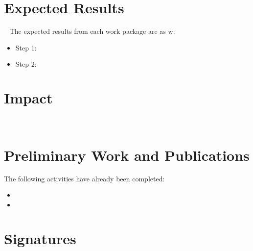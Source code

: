 \section{Expected Results}\
\vspace{1cm}
The expected results from each work package are as w:
\begin{itemize}
	\item Step 1: \vspace{1cm}
	\item Step 2: \vspace{1cm}

\end{itemize}

\vspace{1cm}
\section{Impact}\


\section{Preliminary Work and Publications}
\vspace{1cm}
The following activities have already been completed:

\begin{itemize}
	\item \vspace{1cm}
	\item \vspace{1cm}

\end{itemize}


\section{Signatures}
